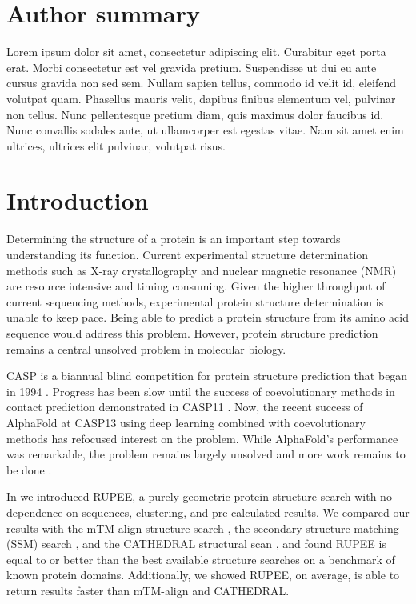 \documentclass[10pt,letterpaper]{article}
\begin{document}
\section*{Author summary}
Lorem ipsum dolor sit amet, consectetur adipiscing elit. Curabitur eget porta erat. Morbi consectetur est vel gravida pretium. Suspendisse ut dui eu ante cursus gravida non sed sem. Nullam sapien tellus, commodo id velit id, eleifend volutpat quam. Phasellus mauris velit, dapibus finibus elementum vel, pulvinar non tellus. Nunc pellentesque pretium diam, quis maximus dolor faucibus id. Nunc convallis sodales ante, ut ullamcorper est egestas vitae. Nam sit amet enim ultrices, ultrices elit pulvinar, volutpat risus.

\linenumbers

\section*{Introduction}

Determining the structure of a protein is an important step towards understanding its function.
Current experimental structure determination methods such as X-ray crystallography and nuclear magnetic resonance (NMR) are resource intensive and timing consuming.
Given the higher throughput of current sequencing methods, experimental protein structure determination is unable to keep pace.
Being able to predict a protein structure from its amino acid sequence would address this problem. 
However, protein structure prediction remains a central unsolved problem in molecular biology. 

CASP is a biannual blind competition for protein structure prediction that began in 1994 \cite{Moult1995}.
Progress has been slow until the success of coevolutionary methods in contact prediction demonstrated in CASP11 \cite{Moult2016}.
Now, the recent success of AlphaFold at CASP13 \cite{alq2019} using deep learning combined with coevolutionary methods has refocused interest on the problem. 
While AlphaFold's performance was remarkable, the problem remains largely unsolved and more work remains to be done \cite{alq2019}. 

In \cite{Ayoub2019} we introduced RUPEE, a purely geometric protein structure search with no dependence on sequences, clustering, and pre-calculated results. 
We compared our results with the mTM-align structure search \cite{Dong2018}, the secondary structure matching (SSM) search \cite{Krissinel2004}, and the CATHEDRAL structural scan \cite{Redfern2007}, and found RUPEE is equal to or better than the best available structure searches on a benchmark of known protein domains. 
Additionally, we showed RUPEE, on average, is able to return results faster than mTM-align and CATHEDRAL. 
\end{document}
